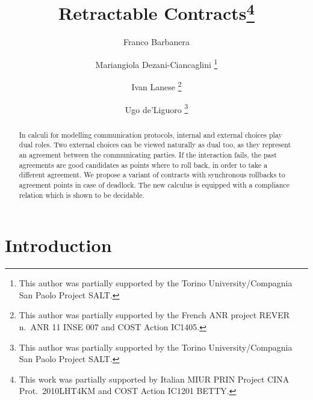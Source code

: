 \documentclass[UKenglish]{eptcs}
\begin{document}
\title{Retractable Contracts\thanks{This work was partially supported by Italian MIUR PRIN
Project CINA Prot.\ 2010LHT4KM and COST Action IC1201 BETTY.}
}



\def\titlerunning{Retractable Contracts}

\author{
Franco Barbanera \and
Mariangiola Dezani-Ciancaglini \thanks{This author was partially supported by the Torino University/Compagnia San Paolo Project SALT.}
\and
Ivan Lanese \thanks{This author was partially supported by the French ANR project REVER n.\ ANR 11 INSE 007 and COST Action IC1405.}
\and
Ugo de'Liguoro  \thanks{This author was partially supported by the Torino University/Compagnia San Paolo Project SALT.}
}



\def\authorrunning{Barbanera, Dezani, Lanese and de'Liguoro}

\providecommand{\publicationstatus}{To appear in EPTCS.}

\clearpage




\maketitle


\begin{abstract}
In calculi for modelling communication protocols, internal and external choices play dual roles. Two external choices can be viewed naturally as dual too, as they represent an agreement between the communicating  parties. If the interaction fails, the past agreements are good candidates as points where to roll back, in order to take a different agreement. We propose a variant of contracts with synchronous rollbacks to agreement points in case of deadlock. The new calculus is equipped with a compliance relation which is shown to be decidable. 
\end{abstract}


\thispagestyle{empty}

\section{Introduction}
\label{sect:introduction}
\end{document}
